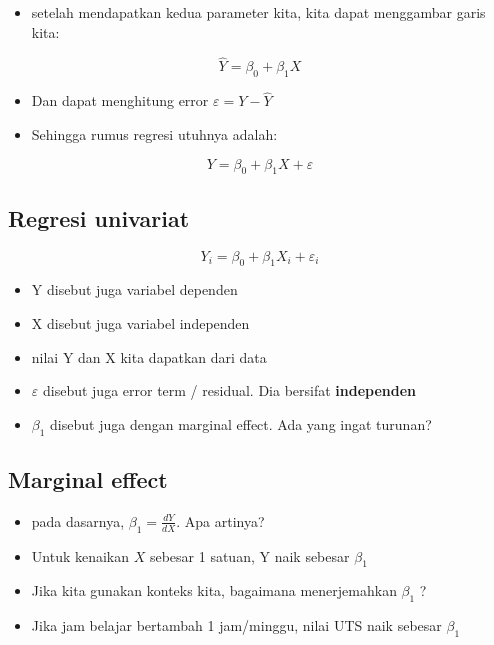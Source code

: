 \documentclass[
  letterpaper,
  DIV=11,
  numbers=noendperiod]{scrartcl}
\providecommand{\tightlist}{%
  \setlength{\itemsep}{0pt}\setlength{\parskip}{0pt}}\usepackage{longtable,booktabs,array}
\begin{document}
\begin{itemize}
\tightlist
\item
  setelah mendapatkan kedua parameter kita, kita dapat menggambar garis
  kita:
\end{itemize}

\[
\hat{Y}=\beta_0+\beta_1 X
\]

\begin{itemize}
\item
  Dan dapat menghitung error \(\varepsilon=Y-\hat{Y}\)
\item
  Sehingga rumus regresi utuhnya adalah:
\end{itemize}

\[
Y=\beta_0+\beta_1 X + \varepsilon
\]

\subsection{Regresi univariat}\label{regresi-univariat}

\[
Y_i=\beta_0+\beta_1 X_i+\varepsilon_i
\]

\begin{itemize}
\item
  Y disebut juga variabel dependen
\item
  X disebut juga variabel independen
\item
  nilai Y dan X kita dapatkan dari data
\item
  \(\varepsilon\) disebut juga error term / residual. Dia bersifat
  \textbf{independen}
\item
  \(\beta_1\) disebut juga dengan marginal effect. Ada yang ingat
  turunan?
\end{itemize}

\subsection{Marginal effect}\label{marginal-effect-2}

\begin{itemize}
\item
  pada dasarnya, \(\beta_1=\frac{dY}{dX}\). Apa artinya?
\item
  Untuk kenaikan \(X\) sebesar 1 satuan, Y naik sebesar \(\beta_1\)
\item
  Jika kita gunakan konteks kita, bagaimana menerjemahkan \(\beta_1\) ?
\item
  Jika jam belajar bertambah 1 jam/minggu, nilai UTS naik sebesar
  \(\beta_1\)
\end{itemize}
\end{document}

